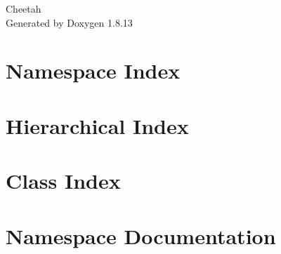 \documentclass[twoside]{book}
\newcommand{\+}{\discretionary{\mbox{\scriptsize$\hookleftarrow$}}{}{}}
\newcommand{\clearemptydoublepage}{%
  \newpage{\pagestyle{empty}\cleardoublepage}%
}
\begin{document}
\hypersetup{pageanchor=false,
             bookmarksnumbered=true,
             pdfencoding=unicode
            }
\begin{titlepage}
\vspace*{7cm}
\begin{center}%
{\Large Cheetah }\\
\vspace*{1cm}
{\large Generated by Doxygen 1.8.13}\\
\end{center}
\end{titlepage}
\clearemptydoublepage
{}
\tableofcontents
\clearemptydoublepage
{}
\hypersetup{pageanchor=true}

\chapter{Namespace Index}

\chapter{Hierarchical Index}

\chapter{Class Index}

\chapter{Namespace Documentation}














\end{document}
